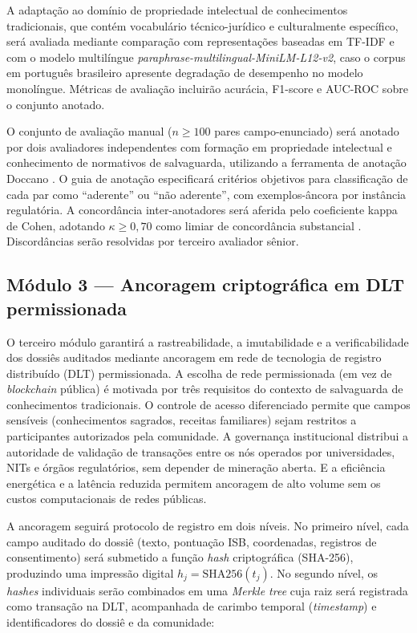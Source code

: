 \documentclass[preprint,12pt,authoryear]{elsarticle}
\begin{document}
A adaptação ao domínio de propriedade intelectual de conhecimentos tradicionais, que contém vocabulário técnico-jurídico e culturalmente específico, será avaliada mediante comparação com representações baseadas em TF-IDF e com o modelo multilíngue \textit{paraphrase-multilingual-MiniLM-L12-v2}, caso o corpus em português brasileiro apresente degradação de desempenho no modelo monolíngue. Métricas de avaliação incluirão acurácia, F1-score e AUC-ROC sobre o conjunto anotado.

O conjunto de avaliação manual ($n \geq 100$ pares campo-enunciado) será anotado por dois avaliadores independentes com formação em propriedade intelectual e conhecimento de normativos de salvaguarda, utilizando a ferramenta de anotação Doccano \citep{Nakayama2018}. O guia de anotação especificará critérios objetivos para classificação de cada par como ``aderente'' ou ``não aderente'', com exemplos-âncora por instância regulatória. A concordância inter-anotadores será aferida pelo coeficiente kappa de Cohen, adotando $\kappa \geq 0{,}70$ como limiar de concordância substancial \citep{Landis1977}. Discordâncias serão resolvidas por terceiro avaliador sênior.

\subsection{Módulo 3 --- Ancoragem criptográfica em DLT permissionada}
\label{subsec:dlt}

O terceiro módulo garantirá a rastreabilidade, a imutabilidade e a verificabilidade dos dossiês auditados mediante ancoragem em rede de tecnologia de registro distribuído (DLT) permissionada. A escolha de rede permissionada (em vez de \textit{blockchain} pública) é motivada por três requisitos do contexto de salvaguarda de conhecimentos tradicionais. O controle de acesso diferenciado permite que campos sensíveis (conhecimentos sagrados, receitas familiares) sejam restritos a participantes autorizados pela comunidade. A governança institucional distribui a autoridade de validação de transações entre os nós operados por universidades, NITs e órgãos regulatórios, sem depender de mineração aberta. E a eficiência energética e a latência reduzida permitem ancoragem de alto volume sem os custos computacionais de redes públicas.

A ancoragem seguirá protocolo de registro em dois níveis. No primeiro nível, cada campo auditado do dossiê (texto, pontuação ISB, coordenadas, registros de consentimento) será submetido a função \textit{hash} criptográfica (SHA-256), produzindo uma impressão digital $h_j = \text{SHA256}(t_j)$. No segundo nível, os \textit{hashes} individuais serão combinados em uma \textit{Merkle tree} cuja raiz será registrada como transação na DLT, acompanhada de carimbo temporal (\textit{timestamp}) e identificadores do dossiê e da comunidade:
\end{document}
